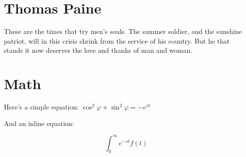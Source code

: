 \documentclass[11pt]{article}
\newcommand{\laplace}{$$\int_0^\infty e^{-st}f(t)$$}
\begin{document}
\section{Thomas Paine}
    
    These are the times that try men's souls. The summer soldier, and the sunshine patriot, will in this crisis shrink from the service of his country. But he that stands it now deserves the love and thanks of man and woman.

\section{Math}

Here's a simple equation: $\cos^2 \varphi + \sin^2 \varphi = -e^{i\pi}$

And an inline equation:

    \laplace
    
\end{document}
